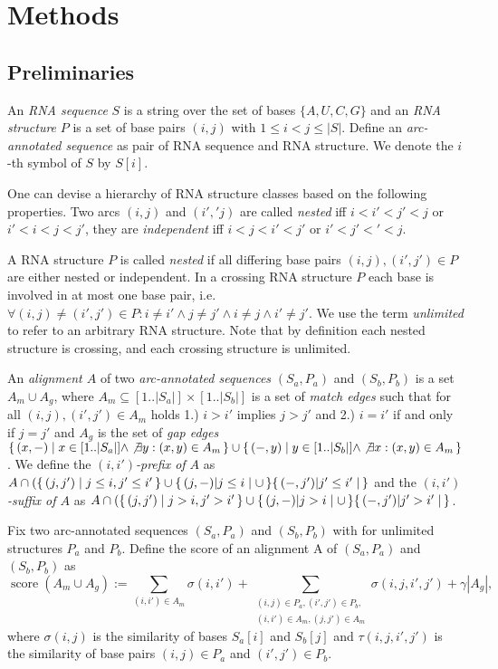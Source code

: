 \documentclass[11pt]{llncs}
\newcommand*{\PSET}[2]{\{\,#1\mid#2\,\}}
\newcommand{\score}{\operatorname{score}}
\begin{document}
\section{Methods}

\subsection{Preliminaries}
An \emph{RNA sequence} $S$ is a string over the set of bases
$\{A,U,C,G\}$ and an \emph{RNA structure} $P$ is a set of base pairs
$(i,j)$ with $1 \leq i< j \leq |S|$. Define an \emph{arc-annotated
  sequence} as pair of RNA sequence and RNA structure.  We denote the
$i$-th symbol of $S$ by $S[i]$.

One can devise a hierarchy of RNA structure classes based on the
following properties. Two arcs $(i,j)$ and $(i','j)$ are called
\emph{nested} iff $i<i'<j'<j$ or $i'<i<j<j'$, they are
\emph{independent} iff $i<j<i'<j'$ or $i'<j'<'<j$.

A RNA structure $P$ is called \emph{nested} if all differing base
pairs $(i,j),(i',j')\in P$ are either nested or independent.  In a
crossing RNA structure $P$ each base is involved in at most one base
pair, i.e. $\forall (i,j)\neq(i',j')\in P: i\neq i' \land j\neq j'
\land i\neq j \land i'\neq j'$. We use the term \emph{unlimited} to
refer to an arbitrary RNA structure. Note that by definition each
nested structure is crossing, and each crossing structure is
unlimited.

An \emph{alignment $A$} of two \emph{arc-annotated sequences}
$(S_a,P_a)$ and $(S_b,P_b)$ is a set $A_m\cup A_g$, where
$A_m\subseteq [1..|S_a|] \times [1..|S_b|]$ is a set of \emph{match
  edges} such that for all $(i,j),(i',j')\in A_m$ holds 1.) $i>i'$
implies $j>j'$ and 2.)  $i=i'$ if and only if $j=j'$ and $A_g$ is the
set of \emph{gap edges} $\PSET{(x,-)}{x\in [1..|S_a|]\land \not\exists
  y: (x,y)\in A_m}\cup\PSET{(-,y)}{y\in [1..|S_b|]\land \not\exists x:
  (x,y)\in A_m}$.
%
We define the \emph{$(i,i')$-prefix of $A$} as
$A\cap(\PSET{(j,j')}{j\leq i,j'\leq i'}\cup\PSET{(j,-)|j\leq i}\cup\PSET{(-,j')|j'\leq i'}$
and the  \emph{$(i,i')$-suffix of $A$} as
$A\cap(\PSET{(j,j')}{j>i,j'>i'}\cup\PSET{(j,-)|j>i}\cup\PSET{(-,j')|j'>i'}$.


Fix two arc-annotated sequences $(S_a,P_a)$ and $(S_b,P_b)$ with for
unlimited structures $P_a$ and $P_b$. Define the score of an
alignment A of $(S_a,P_a)$ and $(S_b,P_b)$ as
\begin{displaymath}
  \score(A_m\cup A_g) :=
  \sum_{(i,i')\in A_m} \sigma(i,i')
  + \sum_{\substack{(i,j)\in P_a,(i',j')\in P_b,\\(i,i')\in A_m,(j,j')\in A_m}} \sigma(i,j,i',j')
  + \gamma |A_g|,
\end{displaymath}
where $\sigma(i,j)$ is the similarity of bases $S_a[i]$ and $S_b[j]$
and $\tau(i,j,i',j')$ is the similarity of base pairs $(i,j)\in P_a$
and $(i',j')\in P_b$.
\end{document}
